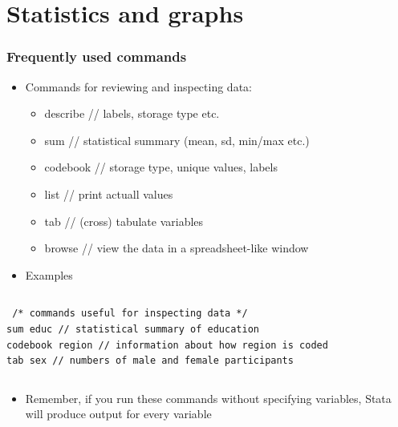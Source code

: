 \documentclass[table]{beamer}
\begin{document}
\section{Statistics and graphs}
\label{sec-3}
\begin{frame}[fragile]
\frametitle{Frequently used commands}
\label{sec-3-1}

\begin{itemize}
\item Commands for reviewing and inspecting data:
\begin{itemize}
\item describe // labels, storage type etc.
\item sum // statistical summary (mean, sd, min/max etc.)
\item codebook // storage type, unique values, labels
\item list // print actuall values
\item tab // (cross) tabulate variables
\item browse // view the data in a spreadsheet-like window
\end{itemize}
\item Examples
\end{itemize}
\vspace{-.5em} \begin{columns}  \begin{block}{}

\begin{verbatim}
 /* commands useful for inspecting data */
sum educ // statistical summary of education 
codebook region // information about how region is coded
tab sex // numbers of male and female participants
\end{verbatim}
\end{block} \end{columns}

\begin{itemize}
\item Remember, if you run these commands without specifying variables, Stata will produce output for every variable
\end{itemize}
\end{frame}
\end{document}
